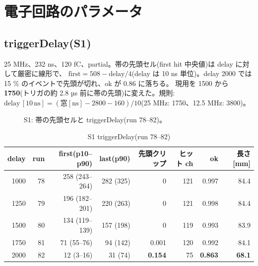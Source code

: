 \documentclass[a4paper,11pt]{ltjsarticle}
\begin{document}
\section{電子回路のパラメータ}

\subsection{triggerDelay(S1)}
25 MHz、232 ns、120 fC、partial。帯の先頭セル(first hit 中央値)は delay に対して厳密に線形で、
$\mathrm{first} = 508 - \mathrm{delay}/4$(delay は 10 ns 単位)。delay 2000 では 15 \% のイベントで先頭が切れ、ok が 0.86 に落ちる。
現用を 1500 から \textbf{1750}(トリガの約 2.8 µs 前に帯の先頭)に変えた。規則: $\mathrm{delay}\,[10\,\mathrm{ns}] = (\text{窓}[\mathrm{ns}] - 2800 - 160)/10$(25 MHz: 1750、12.5 MHz: 3800)。

\begin{figure}[h]\centering
{}
\caption{S1: 帯の先頭セルと triggerDelay(run 78--82)。}
\end{figure}

\begin{table}[h]\centering\small
\caption{S1 triggerDelay(run 78--82)}
\begin{tabular}{rrrrrrrr}
\toprule
delay & run & first(p10--p90) & last(p90) & 先頭クリップ & ヒット ch & ok & 長さ [mm] \\
\midrule
1000 & 78 & 258 (243--264) & 282 (325) & 0 & 121 & 0.997 & 84.4 \\
1250 & 79 & 196 (182--201) & 220 (263) & 0 & 121 & 0.998 & 84.4 \\
1500 & 80 & 134 (119--139) & 157 (198) & 0 & 119 & 0.993 & 83.9 \\
1750 & 81 & 71 (55--76) & 94 (142) & 0.001 & 120 & 0.992 & 84.1 \\
2000 & 82 & 12 (3--16) & 31 (74) & \textbf{0.154} & 75 & \textbf{0.863} & \textbf{68.1} \\
\bottomrule
\end{tabular}
\end{table}
\end{document}
